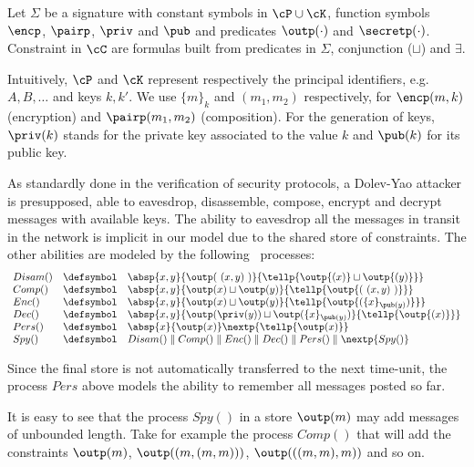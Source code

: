 \documentclass{tlp}
\begin{document}
\begin{definition}\label{def:css} Let  $\Sigma$ be a signature with constant symbols in $\cP \cup \cK$, function symbols $\encp$,  $\pairp$,  $\priv$ and $\pub$ and predicates $\outp(\cdot)$ and  $\secretp(\cdot)$. Constraint  in $\cC$ are formulas 
built from predicates in $\Sigma$, conjunction ($\sqcup$) and $\exists$. 


\end{definition}

Intuitively, $\cP$ and $\cK$ represent respectively the  principal identifiers, e.g.  $A,B,\ldots$  and  keys $k,k'$. We use $\{m\}_k$ and  $(m_1,m_2)$ respectively,  for  $\encp(m,k)$ (encryption) and   $\pairp(m_1,m_2)$ (composition).  For the generation of keys, $\priv(k)$ stands for the private key associated to the value $k$ and $\pub(k)$ for its public key. 


As standardly done in the verification of security protocols, a Dolev-Yao attacker \cite{dolev-yao} is presupposed, able to  eavesdrop, disassemble, compose, encrypt and decrypt messages with available keys. The ability to eavesdrop all the messages in transit in the network is implicit in our model due to the shared store of constraints. The other abilities are  modeled by the following \utcc\ processes:
\[
\begin{array}{lll}
{Disam}() &\defsymbol & \absp{x,y}{\outp(\ (x,y) \ ) }{ \tellp{\outp{(x)} \sqcup \outp{(y)}}} \\
{Comp}()  &\defsymbol & \absp{x,y}{\outp(x) \sqcup \outp(y)}{  \tellp{\outp{( \ (x,y) \  )}}} \\
{Enc}()&\defsymbol &     \absp{x,y}{\outp(x) \sqcup \outp(y)}{  \tellp{\outp{(\{x\}_{\pub(y)})}}}  \\
{Dec}()&\defsymbol &    \absp{x,y}{\outp(\priv(y)) \sqcup \outp(\{ x\}_{\pub(y)})}{  \tellp{\outp{(x)}}}   \\
{Pers}() & \defsymbol  &    \absp{x}{\outp(x)}\nextp{\tellp{\outp(x)}} \\
{Spy}() & \defsymbol  &  {Disam}() \parallel {Comp}() \parallel {Enc}() 
\parallel  {Dec}() \parallel {Pers}() \parallel \nextp{{Spy}()}
\end{array}
\]

 Since the final store is not automatically transferred to the next time-unit, the process $Pers$ above models the ability to remember all messages  posted so far.

It is easy to see that the process ${Spy}()$ in a store  $\outp(m)$ may add messages of unbounded length. Take for example the process  ${Comp}()$ that will add the constraints $\outp(m)$, $\outp( ( m,(m,m)))$, $\outp(((m,m),m))$ and so on. 
\end{document}
